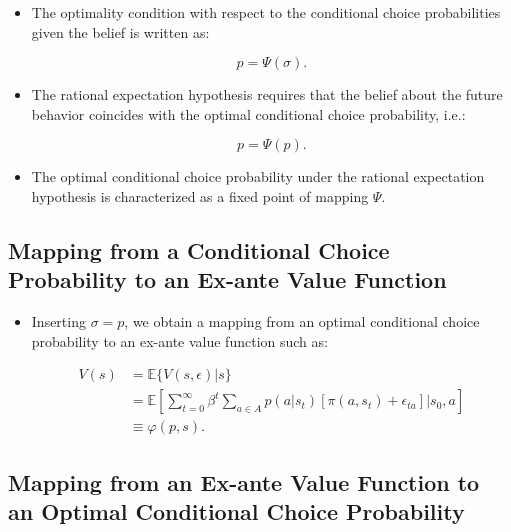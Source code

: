 \documentclass[]{book}
\providecommand{\tightlist}{%
  \setlength{\itemsep}{0pt}\setlength{\parskip}{0pt}}
\begin{document}
\begin{itemize}
\tightlist
\item
  The optimality condition with respect to the conditional choice
  probabilities given the belief is written as:

  \begin{equation}
  p = \Psi(\sigma).
  \end{equation}
\item
  The rational expectation hypothesis requires that the belief about the
  future behavior coincides with the optimal conditional choice
  probability, i.e.:

  \begin{equation}
  p = \Psi(p).
  \end{equation}
\item
  The optimal conditional choice probability under the rational
  expectation hypothesis is characterized as a fixed point of mapping
  \(\Psi\).
\end{itemize}

\subsection{Mapping from a Conditional Choice Probability to an Ex-ante
Value
Function}\label{mapping-from-a-conditional-choice-probability-to-an-ex-ante-value-function}

\begin{itemize}
\tightlist
\item
  Inserting \(\sigma = p\), we obtain a mapping from an optimal
  conditional choice probability to an ex-ante value function such as:

  \begin{equation}
  \begin{split}
  V(s) &= \mathbb{E}\{V(s, \epsilon)|s\}\\
  &= \mathbb{E}\left[ \sum_{t = 0}^\infty \beta^t \sum_{a \in A}p(a|s_t)\left[\pi(a, s_t) + \epsilon_{ta}\right]\Bigg|s_0, a\right]\\
  &\equiv \varphi(p, s).
  \end{split}
  \end{equation}
\end{itemize}

\subsection{Mapping from an Ex-ante Value Function to an Optimal
Conditional Choice
Probability}\label{mapping-from-an-ex-ante-value-function-to-an-optimal-conditional-choice-probability}
\end{document}
